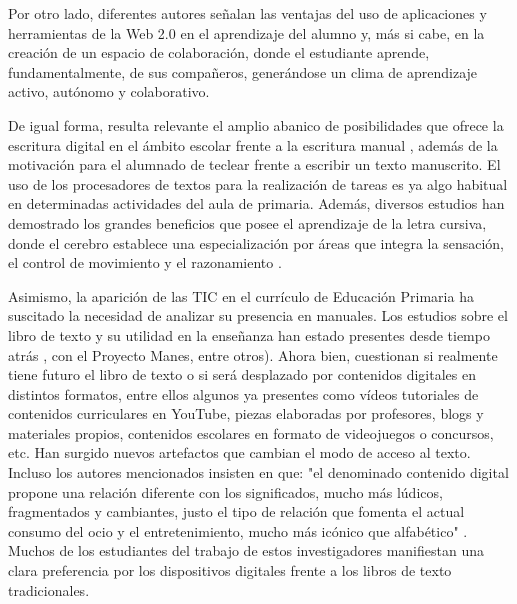 \documentclass[spanish]{textolivre}
\begin{document}
Por otro lado, diferentes autores \cite{diaz_lazaro_redes_2013, dahlstrom__2014} señalan las ventajas del uso de aplicaciones y herramientas de la Web 2.0 en el aprendizaje del alumno y, más si cabe, en la creación de un espacio de colaboración, donde el estudiante aprende, fundamentalmente, de sus compañeros, generándose un clima de aprendizaje activo, autónomo y colaborativo. 

De igual forma, resulta relevante el amplio abanico de posibilidades que ofrece la escritura digital en el ámbito escolar frente a la escritura manual \cite{vera_castro_tics_2012}, además de la motivación para el alumnado de teclear frente a escribir un texto manuscrito. El uso de los procesadores de textos para la realización de tareas es ya algo habitual en determinadas actividades del aula de primaria. Además, diversos estudios han demostrado los grandes beneficios que posee el aprendizaje de la letra cursiva, donde el cerebro establece una especialización por áreas que integra la sensación, el control de movimiento y el razonamiento \cite{james_role_2009, james_effects_2012}. 

Asimismo, la aparición de las TIC en el currículo de Educación Primaria ha suscitado la necesidad de analizar su presencia en manuales. Los estudios sobre el libro de texto y su utilidad en la enseñanza han estado presentes desde tiempo atrás \cite{escudero_munoz_investigacion_1983, valls_montes_manuales_1998, choppin_les_2002, escolano_benito_manual_2009, rodriguez_rodriguez_digital_2015, villalain_benito_proyecto_2000}, con el Proyecto Manes, entre otros). Ahora bien, \textcite{san_martin_alonso_controversias_2018} cuestionan si realmente tiene futuro el libro de texto o si será desplazado por contenidos digitales en distintos formatos, entre ellos algunos ya presentes como vídeos tutoriales de contenidos curriculares en YouTube, piezas elaboradas por profesores, blogs y materiales propios, contenidos escolares en formato de videojuegos o concursos, etc. Han surgido nuevos artefactos que cambian el modo de acceso al texto. Incluso los autores mencionados insisten en que: "el denominado contenido digital propone una relación diferente con los significados, mucho más lúdicos, fragmentados y cambiantes, justo el tipo de relación que fomenta el actual consumo del ocio y el entretenimiento, mucho más icónico que alfabético" \cite[p. 8]{san_martin_alonso_controversias_2018}. Muchos de los estudiantes del trabajo de estos investigadores manifiestan una clara preferencia por los dispositivos digitales frente a los libros de texto tradicionales.
\end{document}
